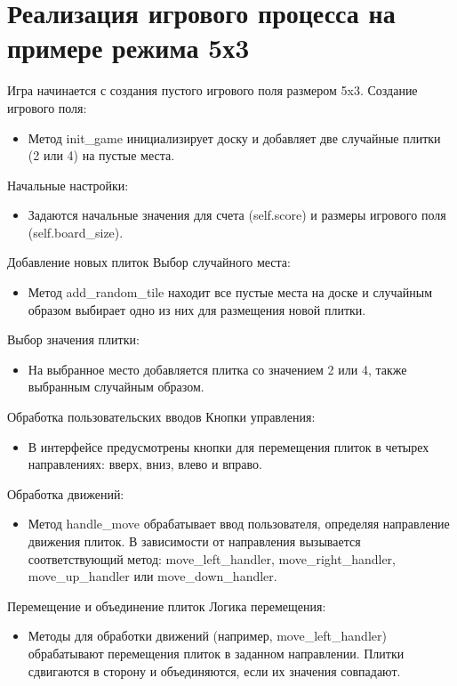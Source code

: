 \section{\label{subsec:ch01/sec01/sub01}Реализация игрового процесса на примере режима 5х3}
Игра начинается с создания пустого игрового поля размером 5x3. 
    Создание игрового поля:
\begin{itemize}
\item Метод init\_game инициализирует доску и добавляет две случайные плитки (2 или 4) на пустые места.
\end{itemize}
Начальные настройки:
\begin{itemize}
\item Задаются начальные значения для счета (self.score) и размеры игрового поля (self.board\_size).
\end{itemize}
Добавление новых плиток
Выбор случайного места:
\begin{itemize}
\item Метод add\_random\_tile находит все пустые места на доске и случайным образом выбирает одно из них для размещения новой плитки.
\end{itemize}
Выбор значения плитки:
\begin{itemize}
\item На выбранное место добавляется плитка со значением 2 или 4, также выбранным случайным образом.
\end{itemize}
Обработка пользовательских вводов
Кнопки управления:
\begin{itemize}
\item В интерфейсе предусмотрены кнопки для перемещения плиток в четырех направлениях: вверх, вниз, влево и вправо.
\end{itemize}
Обработка движений:
\begin{itemize}
\item Метод handle\_move обрабатывает ввод пользователя, определяя направление движения плиток. В зависимости от направления вызывается соответствующий метод: move\_left\_handler, move\_right\_handler, move\_up\_handler или move\_down\_handler.
\end{itemize}
Перемещение и объединение плиток
Логика перемещения:
\begin{itemize}
\item Методы для обработки движений (например, move\_left\_handler) обрабатывают перемещения плиток в заданном направлении. Плитки сдвигаются в сторону и объединяются, если их значения совпадают.
\end{itemize}
